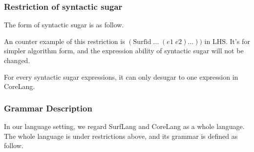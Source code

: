 \subsubsection{Restriction of syntactic sugar}
The form of syntactic sugar is as follow.


An counter example of this restriction is $(\mbox{Surfid}\;\ldots\;(e1\;e2)\ldots))$ in LHS. It's for simpler algorithm form, and the expression ability of syntactic sugar will not be changed.

\begin{Def}[Unambiguous]
For every syntactic sugar expressions, it can only desugar to one expression in CoreLang.
\end{Def}

\subsubsection{Grammar Description}
In our language setting, we regard SurfLang and CoreLang as a whole language. The whole language is under restrictions above, and its grammar is defined as follow.

